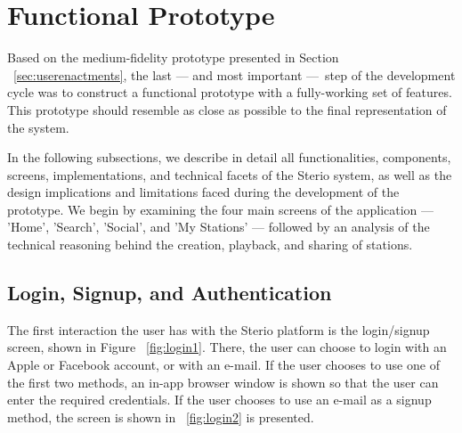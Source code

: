 
\section{Functional Prototype}

Based on the medium-fidelity prototype presented in Section ~\ref{sec:userenactments}, the last — and most important — step of the development cycle was to construct a functional prototype with a fully-working set of features. This prototype should resemble as close as possible to the final representation of the system. 

In the following subsections, we describe in detail all functionalities, components, screens, implementations, and technical facets of the Sterio system, as well as the design implications and limitations faced during the development of the prototype. We begin by examining the four main screens of the application — 'Home', 'Search', 'Social', and 'My Stations' — followed by an analysis of the technical reasoning behind the creation, playback, and sharing of stations. 

\newpage
\subsection{Login, Signup, and Authentication}
\label{subsec:lsa}

The first interaction the user has with the Sterio platform is the login/signup screen, shown in Figure ~\ref{fig:login1}. There, the user can choose to login with an Apple or Facebook account, or with an e-mail. If the user chooses to use one of the first two methods, an in-app browser window is shown so that the user can enter the required credentials. If the user chooses to use an e-mail as a signup method, the screen is shown in ~\ref{fig:login2} is presented.

